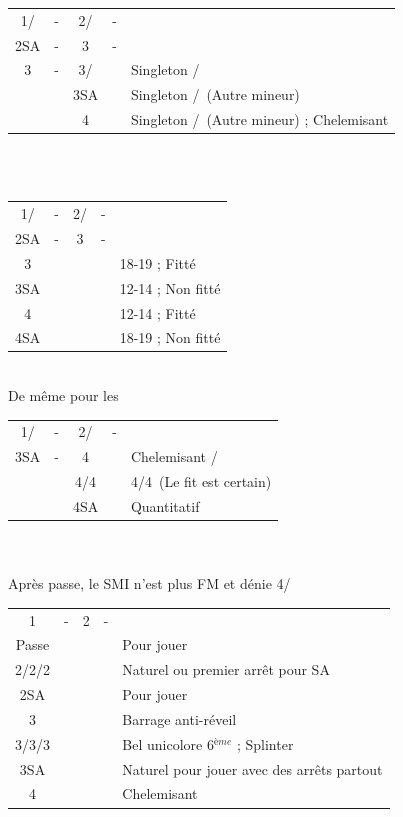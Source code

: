 \documentclass[a4paper, oneside, 11pt]{report}
\begin{document}
		\begin{tabular}{cccc|l}
		1\trefle/\carreau & - & 2\trefle/\carreau & - &\\
		2SA & - & 3\trefle & - &\\
		3\carreau & - & 3\coeur/\pique && Singleton \coeur/\pique\\	
		&& 3SA && Singleton \carreau/\trefle\ (Autre mineur)\\
		&& 4\trefle && Singleton \carreau/\trefle\ (Autre mineur) ; Chelemisant\\
		\end{tabular}\\\\

		\begin{tabular}{cccc|l}
		1\trefle/\carreau & - & 2\trefle/\carreau & - &\\
		2SA & - & 3\carreau & - &\\
		3\coeur &&&& 18-19 ; Fitté\\
		3SA &&&& 12-14 ; Non fitté\\
		4\coeur &&&& 12-14 ; Fitté\\
		4SA &&&& 18-19 ; Non fitté\\
		\end{tabular}\\
		De même pour les \pique\\

		\begin{tabular}{cccc|l}
		1\trefle/\carreau & - & 2\trefle/\carreau & - &\\
		3SA & - & 4\trefle && Chelemisant \trefle/\carreau\\
		&& 4\carreau/4\coeur && 4\coeur/4\pique\ (Le fit est certain)\\
		&& 4SA && Quantitatif\\
		\end{tabular}\\\\

\newpage
		Après passe, le SMI n'est plus FM et dénie 4\coeur/\pique\\
		
		\begin{tabular}{cccc|l}
		1\trefle & - & 2\trefle & - &\\
		Passe &&&& Pour jouer\\
		2\carreau/2\coeur/2\pique &&&& Naturel ou premier arrêt pour SA\\
		2SA &&&& Pour jouer\\
		3\trefle &&&& Barrage anti-réveil\\
		3\carreau/3\coeur/3\pique &&&& Bel unicolore 6$^{ème}$ ; Splinter\\
		3SA &&&& Naturel pour jouer avec des arrêts partout\\
		4\trefle &&&& Chelemisant \trefle\\
		\end{tabular}\\\\
\end{document}
